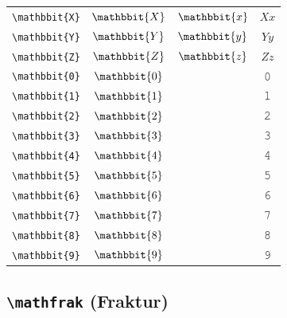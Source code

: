 \documentclass[12pt,a4paper]{article}
\begin{document}
\begin{longtable}{|c|c|c|c|}
\verb|\mathbbit{X}| & $\mathbbit{X}$ & $\mathbbit{x}$ & $ 𝑋 𝑥 $ \\
\verb|\mathbbit{Y}| & $\mathbbit{Y}$ & $\mathbbit{y}$ & $ 𝑌 𝑦 $ \\
\verb|\mathbbit{Z}| & $\mathbbit{Z}$ & $\mathbbit{z}$ & $ 𝑍 𝑧 $ \\
\verb|\mathbbit{0}| & $\mathbbit{0}$ & & 𝟶 \\
\verb|\mathbbit{1}| & $\mathbbit{1}$ & & 𝟷 \\
\verb|\mathbbit{2}| & $\mathbbit{2}$ & & 𝟸 \\
\verb|\mathbbit{3}| & $\mathbbit{3}$ & & 𝟹 \\
\verb|\mathbbit{4}| & $\mathbbit{4}$ & & 𝟺 \\
\verb|\mathbbit{5}| & $\mathbbit{5}$ & & 𝟻 \\
\verb|\mathbbit{6}| & $\mathbbit{6}$ & & 𝟼 \\
\verb|\mathbbit{7}| & $\mathbbit{7}$ & & 𝟽 \\
\verb|\mathbbit{8}| & $\mathbbit{8}$ & & 𝟾 \\
\verb|\mathbbit{9}| & $\mathbbit{9}$ & & 𝟿 \\
\hline
\end{longtable}

\newpage

\subsection*{\texttt{\textbackslash{}mathfrak} (Fraktur)}
\end{document}
